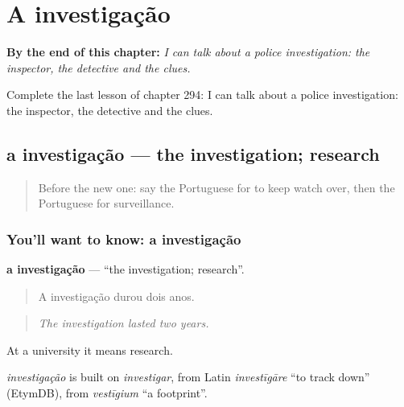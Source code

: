 
\chapter{A investigação}
\label{ch:pt-a-investigacao}

\begin{chapteropening}
\textbf{By the end of this chapter:} \emph{I can talk about a police investigation: the inspector, the detective and the clues.}

Complete the last lesson of chapter 294: I can talk about a police investigation: the inspector, the detective and the clues.
\end{chapteropening}

\section[a investigação]{a investigação — the investigation; research}

\label{lesson:PT-C294-investigacao}



\begin{quote}
Before the new one: say the Portuguese for to keep watch over, then the Portuguese for surveillance.
\end{quote}

\subsection*{You'll want to know: a investigação}
\textbf{a investigação} — \textquotedblleft{}the investigation; research\textquotedblright{}.

\begin{quote}
A investigação durou dois anos.
\end{quote}

\begin{quote}
\emph{The investigation lasted two years.}
\end{quote}

At a university it means research.

\begin{cousinweb}
\emph{investigação} is built on \emph{investigar}, from Latin \emph{investīgāre} \textquotedblleft{}to track down\textquotedblright{} (EtymDB), from \emph{vestīgium} \textquotedblleft{}a footprint\textquotedblright{}.
\end{cousinweb}

